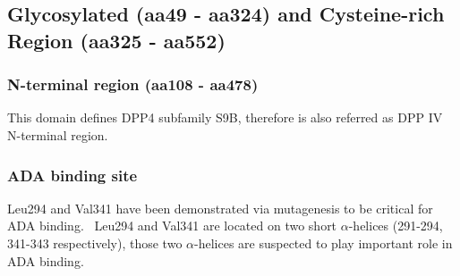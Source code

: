 \subsection{Glycosylated (aa49 - aa324) and Cysteine-rich Region (aa325 - aa552)}


\subsubsection{N-terminal region (aa108 - aa478)}

This domain defines DPP4 subfamily S9B, therefore is also referred as DPP IV N-terminal region. 



\subsubsection{ADA binding site}
Leu294 and Val341 have been demonstrated via mutagenesis to be critical for ADA binding.~\cite{Abbott_1999} Leu294 and Val341 are located on two short $\alpha$-helices (291-294, 341-343 respectively), those two $\alpha$-helices are suspected to play important role in ADA binding. 